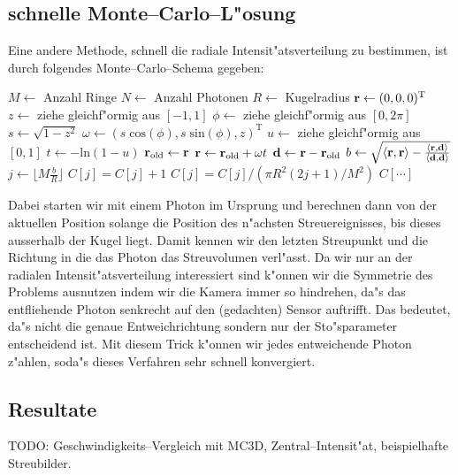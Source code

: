 	\subsection{schnelle Monte--Carlo--L"osung}
	Eine andere Methode, schnell die radiale Intensit"atsverteilung zu bestimmen, ist durch folgendes Monte--Carlo--Schema gegeben:
	\begin{algorithmic}
		\STATE $M\leftarrow$ Anzahl Ringe
		\STATE $N\leftarrow$ Anzahl Photonen
		\STATE $R\leftarrow$ Kugelradius
			\STATE $\mathbf{r}\leftarrow (0,0,0)^\text{T}$
			\REPEAT
				\STATE{}
				\STATE $z\leftarrow$ ziehe gleichf"ormig aus $[-1,1]$
				\STATE $\phi\leftarrow$ ziehe gleichf"ormig aus $[0,2\pi]$
				\STATE $s\leftarrow\sqrt{1-z^2}$
				\STATE $\omega\leftarrow (s\;\text{cos}(\phi),s\;\text{sin}(\phi),z)^\text{T}$
				\STATE{}
				\STATE $u\leftarrow$ ziehe gleichf"ormig aus $[0,1]$
				\STATE $t\leftarrow -\text{ln}(1-u)$
				\STATE $\mathbf{r}_\text{old}\leftarrow\mathbf{r}$
				\STATE $\mathbf{r}\leftarrow\mathbf{r}_\text{old}+\omega t$
			\STATE{}
			\STATE $\mathbf{d}\leftarrow\mathbf{r}-\mathbf{r}_\text{old}$
			\STATE $b\leftarrow\sqrt{\langle\mathbf{r},\mathbf{r}\rangle-\frac{\langle\mathbf{r},\mathbf{d}\rangle}{\langle\mathbf{d},\mathbf{d}\rangle}}$
			\STATE $j\leftarrow\lfloor M\frac{b}{R}\rfloor$
			\STATE $C[j]=C[j]+1$
		\ENDFOR
			\STATE $C[j]=C[j]/(\pi R^2(2j+1)/M^2)$
		\ENDFOR
		\RETURN $C[\cdots]$
	\end{algorithmic}
	Dabei starten wir mit einem Photon im Ursprung und berechnen dann von der aktuellen Position solange die Position des n"achsten Streuereignisses, bis dieses ausserhalb der Kugel liegt. Damit kennen wir den letzten Streupunkt und die Richtung in die das Photon das Streuvolumen verl"asst. Da wir nur an der radialen Intensit"atsverteilung interessiert sind k"onnen wir die Symmetrie des Problems ausnutzen indem wir die Kamera immer so hindrehen, da"s das entfliehende Photon senkrecht auf den (gedachten) Sensor auftrifft. Das bedeutet, da"s nicht die genaue Entweichrichtung sondern nur der Sto"sparameter entscheidend ist. Mit diesem Trick k"onnen wir jedes entweichende Photon z"ahlen, soda"s dieses Verfahren sehr schnell konvergiert.
	
	
	\subsection{Resultate}
	TODO: Geschwindigkeits--Vergleich mit MC3D, Zentral--Intensit"at, beispielhafte Streubilder.
	
